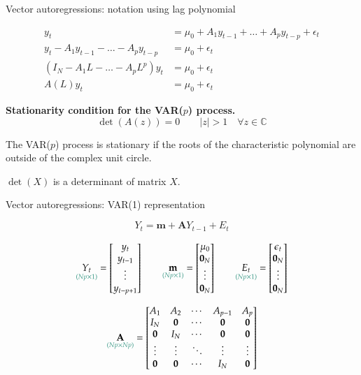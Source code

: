 \documentclass[notes,blackandwhite,mathsans,usenames,dvipsnames]{beamer}
\begin{document}
\begin{frame}{Vector autoregressions: notation using lag polynomial}

\begin{align*}
y_t &= \mu_0 + A_1 y_{t-1} + \dots + A_p y_{t-p} + \epsilon_t\\
y_t - A_1 y_{t-1} - \dots - A_p y_{t-p} &= \mu_0 + \epsilon_t\\
\left(I_N - A_1 L - \dots - A_p L^p\right)y_t &= \mu_0 + \epsilon_t\\
A\left(L\right)y_t &= \mu_0 + \epsilon_t
\end{align*}

\bigskip\textbf{Stationarity condition for the VAR($p$) process.}
$$ \det\left(A\left(z\right)\right) = 0 \qquad|z|> 1 \quad\forall z\in\mathbb{C} $$

{\color{mcxs2}The} VAR($p$) {\color{mcxs2}process is {\color{mcxs1}stationary} if the roots of the characteristic polynomial are outside of the complex unit circle.}

\bigskip$\det(X)$ {\color{mcxs2}is a determinant of matrix} $X$.

\end{frame}



\begin{frame}{Vector autoregressions: VAR(1) representation}

$$ Y_t = \mathbf{m} + \mathbf{A} Y_{t-1} + E_t $$

$$ \underset{\color{mcxs2}(Np\times 1)}{Y_t} = \begin{bmatrix} y_t \\ y_{t-1} \\ \vdots \\ y_{t-p+1} \end{bmatrix} \qquad \underset{\color{mcxs2}(Np\times 1)}{\mathbf{m}} = \begin{bmatrix} \mu_0 \\ \mathbf{0}_N \\ \vdots \\ \mathbf{0}_N \end{bmatrix} \qquad \underset{\color{mcxs2}(Np\times 1)}{E_t} = \begin{bmatrix} \epsilon_t \\ \mathbf{0}_N \\ \vdots \\ \mathbf{0}_N \end{bmatrix}$$


$$ \underset{\color{mcxs2}(Np\times Np)}{\mathbf{A}} = \begin{bmatrix} A_1 & A_2 & \cdots & A_{p-1} & A_p \\ I_N & \mathbf{0} & \cdots & \mathbf{0} & \mathbf{0} \\ \mathbf{0} & I_N & \cdots & \mathbf{0} & \mathbf{0} \\ \vdots & \vdots & \ddots & \vdots & \vdots \\ \mathbf{0} & \mathbf{0} & \cdots & I_N & \mathbf{0}  \end{bmatrix}  $$

\end{frame}
\end{document}
